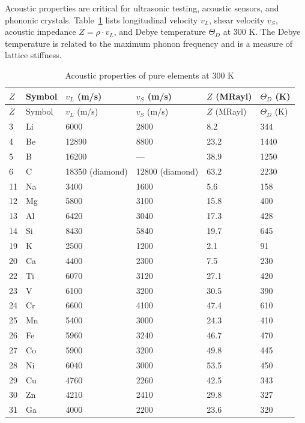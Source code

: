 \documentclass[12pt,a4paper]{article}
\begin{document}
	Acoustic properties are critical for ultrasonic testing, acoustic sensors, and phononic crystals. Table~\ref{tab:acoustic-properties-func} lists longitudinal velocity \(v_L\), shear velocity \(v_S\), acoustic impedance \(Z = \rho \cdot v_L\), and Debye temperature \(\Theta_D\) at 300 K. The Debye temperature is related to the maximum phonon frequency and is a measure of lattice stiffness.
	
	\begin{longtable}{p{0.8cm}p{1.2cm}p{2.2cm}p{2.2cm}p{2.2cm}p{2.2cm}}
		\caption{Acoustic properties of pure elements at 300 K} \label{tab:acoustic-properties-func} \\
		\toprule
		\(Z\) & Symbol & \(v_L\) (m/s) & \(v_S\) (m/s) & \(Z\) (MRayl) & \(\Theta_D\) (K) \\
		\midrule
		\endfirsthead
		\toprule
		\(Z\) & Symbol & \(v_L\) (m/s) & \(v_S\) (m/s) & \(Z\) (MRayl) & \(\Theta_D\) (K) \\
		\midrule
		\endhead
		3  & Li & 6000 & 2800 & 8.2 & 344 \\
		4  & Be & 12890 & 8800 & 23.2 & 1440 \\
		5  & B  & 16200 & --- & 38.9 & 1250 \\
		6  & C  & 18350 (diamond) & 12800 (diamond) & 63.2 & 2230 \\
		11 & Na & 3400 & 1600 & 5.6 & 158 \\
		12 & Mg & 5800 & 3100 & 15.8 & 400 \\
		13 & Al & 6420 & 3040 & 17.3 & 428 \\
		14 & Si & 8430 & 5840 & 19.7 & 645 \\
		19 & K  & 2500 & 1200 & 2.1 & 91 \\
		20 & Ca & 4400 & 2300 & 7.5 & 230 \\
		22 & Ti & 6070 & 3120 & 27.1 & 420 \\
		23 & V  & 6100 & 3200 & 30.5 & 390 \\
		24 & Cr & 6600 & 4100 & 47.4 & 610 \\
		25 & Mn & 5400 & 3000 & 24.3 & 410 \\
		26 & Fe & 5960 & 3240 & 46.7 & 470 \\
		27 & Co & 5900 & 3200 & 49.8 & 445 \\
		28 & Ni & 6040 & 3000 & 53.5 & 450 \\
		29 & Cu & 4760 & 2260 & 42.5 & 343 \\
		30 & Zn & 4210 & 2410 & 29.8 & 327 \\
		31 & Ga & 4000 & 2200 & 23.6 & 320 \\

\end{longtable}
\end{document}
